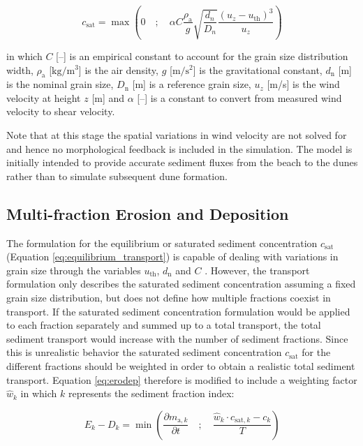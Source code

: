 \begin{equation}
  \label{eq:equilibrium_transport}
    c_{\mathrm{sat}} = \max \left ( 0 \quad ; \quad \alpha C \frac{\rho_{\mathrm{a}}}{g} \sqrt{\frac{d_{n}}{D_{n}}} \frac{\left ( u_z - u_{\mathrm{th}} \right )^3}{u_z} \right )
\end{equation}

\noindent in which $C$ [--] is an empirical constant to account for
the grain size distribution width, $\rho_{\mathrm{a}}$
[$\mathrm{kg/m^3}$] is the air density, $g$ [$\mathrm{m/s^2}$] is the
gravitational constant, $d_{\mathrm{n}}$ [m] is the nominal grain
size, $D_{\mathrm{n}}$ [m] is a reference grain size, $u_z$ [m/s] is
the wind velocity at height $z$ [m] and $\alpha$ [--] is a constant to
convert from measured wind velocity to shear velocity.

Note that at this stage the spatial variations in wind velocity are
not solved for and hence no morphological feedback is included in the
simulation. The model is initially intended to provide accurate
sediment fluxes from the beach to the dunes rather than to simulate
subsequent dune formation.

\subsection{Multi-fraction Erosion and Deposition} \label{sec:weights}

The formulation for the equilibrium or saturated sediment
concentration $c_{\mathrm{sat}}$ (Equation
\ref{eq:equilibrium_transport}) is capable of dealing with variations
in grain size through the variables $u_{\mathrm{th}}$,
$d_{\mathrm{n}}$ and $C$ \citep{Bagnold1937a}. However, the transport
formulation only describes the saturated sediment concentration
assuming a fixed grain size distribution, but does not define how
multiple fractions coexist in transport. If the saturated sediment
concentration formulation would be applied to each fraction separately
and summed up to a total transport, the total sediment transport would
increase with the number of sediment fractions. Since this is
unrealistic behavior the saturated sediment concentration
$c_{\mathrm{sat}}$ for the different fractions should be weighted in
order to obtain a realistic total sediment transport. Equation
\ref{eq:erodep} therefore is modified to include a weighting factor
$\hat{w}_k$ in which $k$ represents the sediment fraction index:

\begin{equation}
  \label{eq:erodep_multi}
  E_k - D_k = \min \left ( \frac{\partial m_{\mathrm{a},k}}{\partial t} \quad ; \quad \frac{\hat{w}_k \cdot c_{\mathrm{sat},k} - c_k}{T} \right )
\end{equation}

